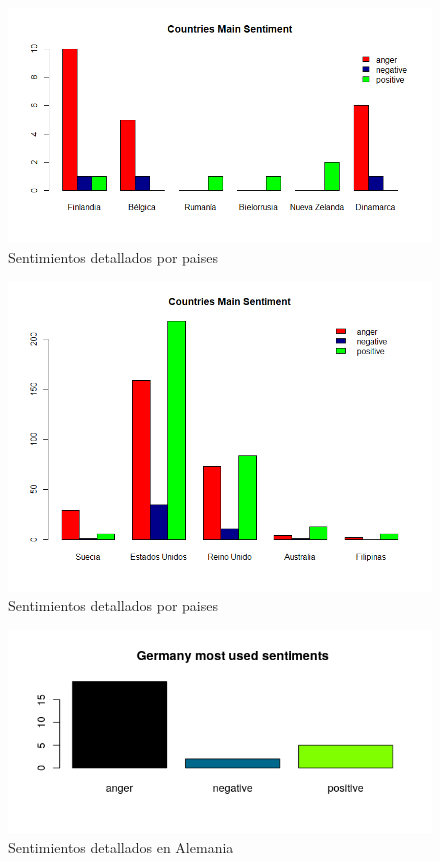 \begin{figure}[h!]
	\centering
	\includegraphics[width=\linewidth]{Imagenes/country2}
	\caption{Sentimientos detallados por paises}
	\label{fig:country2}
\end{figure}

\begin{figure}[h]
	\centering
	\includegraphics[width=\linewidth]{Imagenes/country1}
	\caption{Sentimientos detallados por paises}
	\label{fig:country1}
\end{figure}

\begin{figure}[h]
	\centering
	\includegraphics[width=0.7\linewidth]{Imagenes/Germany}
	\caption{Sentimientos detallados en Alemania}
	\label{fig:Germany}
\end{figure}

